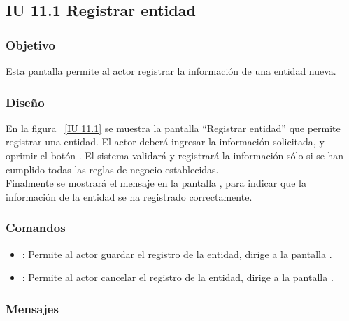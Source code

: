 \subsection{IU 11.1 Registrar entidad}

\subsubsection{Objetivo}
	
	Esta pantalla permite al actor registrar la información de una entidad nueva.

\subsubsection{Diseño}

    En la figura ~\ref{IU 11.1} se muestra la pantalla ``Registrar entidad'' que permite registrar una entidad. El actor deberá ingresar la información solicitada,
    y oprimir el botón . El sistema validará y registrará la información sólo si se han cumplido todas las reglas de negocio establecidas.  \\
    
    Finalmente se mostrará el mensaje  en la pantalla , para indicar que la información de la entidad
    se ha registrado correctamente.        



\subsubsection{Comandos}
\begin{itemize}
	\item {}: Permite al actor guardar el registro de la entidad, dirige a la pantalla .
	\item {}: Permite al actor cancelar el registro de la entidad, dirige a la pantalla .
\end{itemize}

\subsubsection{Mensajes}

